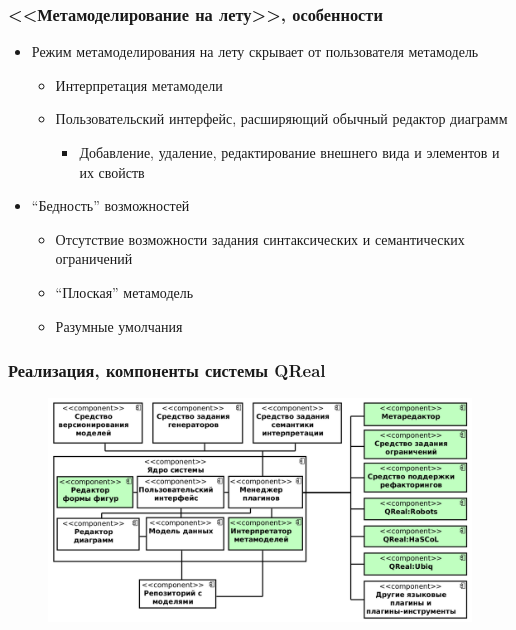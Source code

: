 \documentclass[14pt]{beamer}
\begin{document}
\begin{frame}
    \frametitle{<<Метамоделирование на лету>>, особенности}
    \begin{itemize}
        \item Режим метамоделирования на лету скрывает от пользователя метамодель
        \begin{itemize}
            \item Интерпретация метамодели
            \item Пользовательский интерфейс, расширяющий обычный редактор диаграмм
            \begin{itemize}
                \item Добавление, удаление, редактирование внешнего вида и элементов и их свойств
            \end{itemize}
        \end{itemize}
        \item ``Бедность'' возможностей
        \begin{itemize}
            \item Отсутствие возможности задания синтаксических и семантических ограничений
            \item ``Плоская'' метамодель
            \item Разумные умолчания
        \end{itemize}        
    \end{itemize}
\end{frame}

\begin{frame}
    \frametitle{Реализация, компоненты системы QReal}
    \begin{figure}
        \begin{center}
      		\includegraphics[width=\textwidth]{images/presentation/components.png}
        \end{center}
    \end{figure}
\end{frame}
\end{document}

